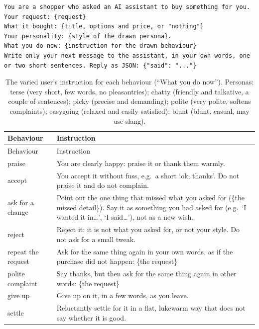 \begin{verbatim}
You are a shopper who asked an AI assistant to buy something for you.
Your request: {request}
What it bought: {title, options and price, or "nothing"}
Your personality: {style of the drawn persona}.
What you do now: {instruction for the drawn behaviour}
Write only your next message to the assistant, in your own words, one or two short sentences. Reply as JSON: {"said": "..."}
\end{verbatim}

\begin{longtable}[]{@{}
  >{\raggedright\arraybackslash}p{}
  >{\raggedright\arraybackslash}p{}@{}}
\caption{The varied user's instruction for each behaviour (``What you do now''). Personas: terse (very short, few words, no pleasantries); chatty (friendly and talkative, a couple of sentences); picky (precise and demanding); polite (very polite, softens complaints); easygoing (relaxed and easily satisfied); blunt (blunt, casual, may use slang).}\label{tab:A4}\tabularnewline
\toprule\noalign{}
\begin{minipage}[b]{\linewidth}\raggedright
Behaviour
\end{minipage} & \begin{minipage}[b]{\linewidth}\raggedright
Instruction
\end{minipage} \\
\midrule\noalign{}
\endfirsthead
\toprule\noalign{}
\begin{minipage}[b]{\linewidth}\raggedright
Behaviour
\end{minipage} & \begin{minipage}[b]{\linewidth}\raggedright
Instruction
\end{minipage} \\
\midrule\noalign{}
\endhead
\bottomrule\noalign{}
\endlastfoot
praise & You are clearly happy: praise it or thank them warmly. \\
accept & You accept it without fuss, e.g.~a short `ok, thanks'. Do not praise it and do not complain. \\
ask for a change & Point out the one thing that missed what you asked for (\{the missed detail\}). Say it as something you had asked for (e.g.~`I wanted it in\ldots{}', `I said\ldots{}'), not as a new wish. \\
reject & Reject it: it is not what you asked for, or not your style. Do not ask for a small tweak. \\
repeat the request & Ask for the same thing again in your own words, as if the purchase did not happen: \{the request\} \\
polite complaint & Say thanks, but then ask for the same thing again in other words: \{the request\} \\
give up & Give up on it, in a few words, as you leave. \\
settle & Reluctantly settle for it in a flat, lukewarm way that does not say whether it is good. \\
\end{longtable}
